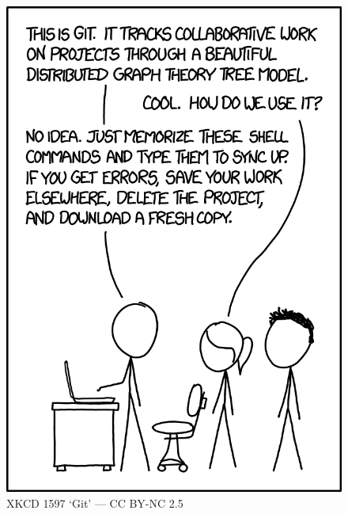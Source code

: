 \documentclass{beamer} \usetheme{Madrid}
\begin{document}
\begin{frame}
    \begin{figure}
        \includegraphics[height=\textheight-2cm]{xkcd.png}
        \caption{XKCD 1597 `Git' --- CC BY-NC 2.5}
    \end{figure}
\end{frame}
\end{document}
